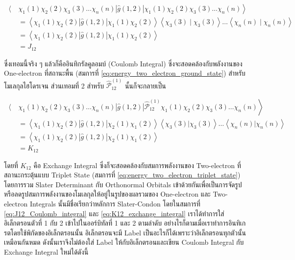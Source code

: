 \begin{equation}
    \label{eq:J12_Coulomb_integral}
    \begin{aligned}
        \left\langle \right. & \chi_1(1) \chi_2(2) \chi_3(3) \dots \chi_n(n)|\hat{g}(1,2)|
        \chi_1(1) \chi_2(2) \chi_3(3) \dots \chi_n(n) \left. \right\rangle                                                           \\
                             & = \left\langle\chi_1(1) \chi_2(2)|\hat{g}(1,2)| \chi_1(1) \chi_2(2)\right\rangle\left\langle\chi_3(3)
        \mid \chi_3(3)\right\rangle \dots\left\langle\chi_n(n) \mid \chi_n(n)\right\rangle                                           \\
                             & = \left\langle\chi_1(1) \chi_2(2)|\hat{g}(1,2)| \chi_1(1) \chi_2(2)\right\rangle                      \\
                             & = J_{12}
    \end{aligned}
\end{equation}

\noindent ซึ่งเทอมนี้จริง ๆ แล้วก็คืออินทิกรัลคูลอมบ์ (Coulomb Integral) ซึ่งจะสอดคล้องกับพลังงานของ One-electron ที่สถานะพื้น
(สมการที่ \eqref{eq:energy_two_electron_ground_state}) สำหรับโมเลกุลไฮโดรเจน ส่วนเทอมที่ 2 สำหรับ
$\hat{\mathcal{P}}_{12}^{(1)}$ นั้นก็จะกลายเป็น

\begin{equation}
    \label{eq:K12_exchange_integral}
    \begin{aligned}
        \left\langle \right. & \chi_1(1) \chi_2(2) \chi_3(3) \dots \chi_n(n)
        |\hat{g}(1,2)|
        \hat{\mathscr{P}}_{12}^{(1)} \chi_1(1) \chi_2(2) \chi_3(3) \dots \chi_n(n) \left. \right\rangle \\
                             & = \left\langle\chi_1(1) \chi_2(2)
        |\hat{g}(1,2)|
        \chi_2(1) \chi_1(2)\right\rangle
        \left\langle\chi_3(3)|\chi_3(3)\right\rangle \dots\left\langle\chi_n(n)|\chi_n(n)\right\rangle  \\
                             & = \left\langle\chi_1(1) \chi_2(2)
        |\hat{g}(1,2)|
        \chi_2(1) \chi_1(2)\right\rangle                                                                \\
                             & = K_{12}
    \end{aligned}
\end{equation}

\noindent โดยที่ $K_{12}$ คือ Exchange Integral ซึ่งก็จะสอดคล้องกับสมการพลังงานของ Two-electron ที่สถานะกระตุ้นแบบ Triplet
State (สมการที่ \eqref{eq:energy_two_electron_triplet_state}) โดยการรวม Slater Determinant กับ Orthonormal Orbitals
เข้าด้วยกันเพื่อเป็นการจัดรูปหรือลดรูปสมการพลังงานของโมเลกุลให้อยู่ในรูปของผลรวมของ One-electron และ Two-electron Integrals
นั้นมีชื่อเรียกว่าหลักการ Slater-Condon โดยในสมการที่ \eqref{eq:J12_Coulomb_integral} และ \eqref{eq:K12_exchange_integral}
เราได้ทำการใส่อิเล็กตรอนตัวที่ 1 กับ 2 เข้าไปในออร์บิทัลที่ 1 และ 2 ตามลำดับ อย่างไรก็ตามเมื่อเราทำการอินทิเกรตโดยใช้พิกัดของอิเล็กตรอนนั้น%
อิเล็กตรอนจะมี Label เป็นอะไรก็ได้เพราะว่าอิเล็กตรอนทุกตัวนั้นเหมือนกันหมด ดังนั้นเราจึงไม่ต้องใส่ Label ให้กับอิเล็กตรอนและเขียน Coulomb
Integral กับ Exchange Integral ใหม่ได้ดังนี้

